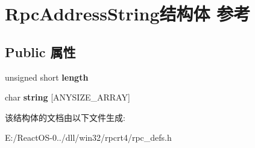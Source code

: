 \hypertarget{struct_rpc_address_string}{}\section{Rpc\+Address\+String结构体 参考}
\label{struct_rpc_address_string}
\subsection*{Public 属性}
\begin{DoxyCompactItemize}
\item 
\mbox{\label{struct_rpc_address_string_ac3bf4def52e000d044e170f0ff23ba26}} 
unsigned short {\bfseries length}
\item 
\mbox{\label{struct_rpc_address_string_adc2adefc0d400082394923897a7bb40e}} 
char {\bfseries string} \mbox{[}A\+N\+Y\+S\+I\+Z\+E\+\_\+\+A\+R\+R\+AY\mbox{]}
\end{DoxyCompactItemize}


该结构体的文档由以下文件生成\+:\begin{DoxyCompactItemize}
\item 
E\+:/\+React\+O\+S-\/0../dll/win32/rpcrt4/rpc\+\_\+defs.\+h\end{DoxyCompactItemize}
